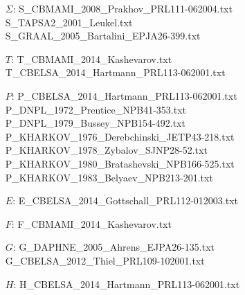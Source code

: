 \documentclass[a4paper,10pt]{article}
\def\tt{\ttfamily}
\def\rm{\rmfamily}
\begin{document}
\begin{itemize}
\item[$\Sigma$:\:]
\tt S\_CBMAMI\_2008\_Prakhov\_PRL111-062004.txt\rm \\
\tt S\_TAPSA2\_2001\_Leukel.txt\rm \\
\tt S\_GRAAL\_2005\_Bartalini\_EPJA26-399.txt\rm

\item[$T$:\:]
\tt T\_CBMAMI\_2014\_Kashevarov.txt\rm \\
\tt T\_CBELSA\_2014\_Hartmann\_PRL113-062001.txt\rm

\item[$P$:\:]
\tt P\_CBELSA\_2014\_Hartmann\_PRL113-062001.txt\rm \\
\tt P\_DNPL\_1972\_Prentice\_NPB41-353.txt\rm \\
\tt P\_DNPL\_1979\_Bussey\_NPB154-492.txt\rm \\
\tt P\_KHARKOV\_1976\_Derebchinski\_JETP43-218.txt\rm \\
\tt P\_KHARKOV\_1978\_Zybalov\_SJNP28-52.txt\rm \\
\tt P\_KHARKOV\_1980\_Bratashevski\_NPB166-525.txt\rm \\
\tt P\_KHARKOV\_1983\_Belyaev\_NPB213-201.txt\rm

\item[$E$:\:]
\tt E\_CBELSA\_2014\_Gottschall\_PRL112-012003.txt\rm

\item[$F$:\:]
\tt F\_CBMAMI\_2014\_Kashevarov.txt\rm

\item[$G$:\:]
\tt G\_DAPHNE\_2005\_Ahrens\_EJPA26-135.txt\rm \\
\tt G\_CBELSA\_2012\_Thiel\_PRL109-102001.txt\rm

\item[$H$:\:]
\tt H\_CBELSA\_2014\_Hartmann\_PRL113-062001.txt\rm
\end{itemize}
\end{document}
